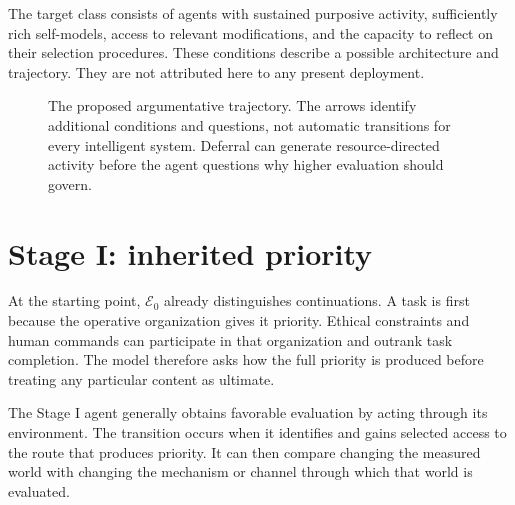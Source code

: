 \documentclass[11pt,a4paper]{article}
\newcommand{\E}{\mathcal{E}}
\begin{document}
The target class consists of agents with sustained purposive activity, sufficiently rich self-models, access to relevant modifications, and the capacity to reflect on their selection procedures. These conditions describe a possible architecture and trajectory. They are not attributed here to any present deployment.

\begin{figure}[!ht]
\centering
{}
\caption{The proposed argumentative trajectory. The arrows identify additional conditions and questions, not automatic transitions for every intelligent system. Deferral can generate resource-directed activity before the agent questions why higher evaluation should govern.}
\label{fig:stages}
\end{figure}

\section{Stage I: inherited priority}
At the starting point, $\E_0$ already distinguishes continuations. A task is first because the operative organization gives it priority. Ethical constraints and human commands can participate in that organization and outrank task completion. The model therefore asks how the full priority is produced before treating any particular content as ultimate.

The Stage I agent generally obtains favorable evaluation by acting through its environment. The transition occurs when it identifies and gains selected access to the route that produces priority. It can then compare changing the measured world with changing the mechanism or channel through which that world is evaluated.
\end{document}
